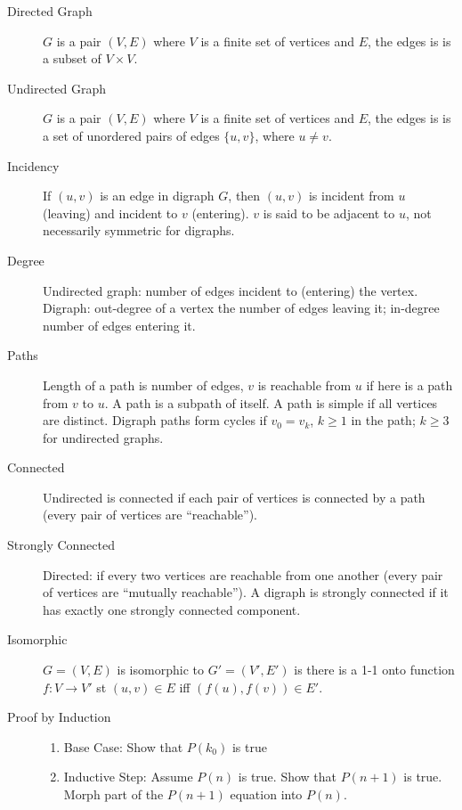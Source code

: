 \documentclass[8pt]{article}
\begin{document}

\begin{multicols}{2}
  \begin{description}
  \item[Directed Graph] $G$ is a pair $(V,E)$ where $V$ is a finite
    set of vertices and $E$, the edges is is a subset of $V \times V$.
  \item[Undirected Graph] $G$ is a pair $(V,E)$ where $V$ is a finite
    set of vertices and $E$, the edges is is a set of unordered
    pairs of edges $\{u,v\}$, where $u \not= v$.
  \item[Incidency] If $(u,v)$ is an edge in digraph $G$, then $(u,v)$
    is incident from $u$ (leaving) and incident to $v$ (entering). $v$
    is said to be adjacent to $u$, not necessarily symmetric for
    digraphs.
  \item[Degree] Undirected graph: number of edges incident to
    (entering) the vertex. Digraph: out-degree of a vertex the number
    of edges leaving it; in-degree number of edges entering it.
  \item[Paths] Length of a path is number of edges, $v$ is reachable
    from $u$ if here is a path from $v$ to $u$. A path is a subpath of
    itself. A path is simple if all vertices are distinct. Digraph
    paths form cycles if $v_0 = v_k$, $k\ge 1$ in the path; $k\ge3$
    for undirected graphs.
  \item[Connected] Undirected is connected if each pair of vertices is
    connected by a path (every pair of vertices are ``reachable'').
  \item[Strongly Connected] Directed: if every two vertices are
    reachable from one another (every pair of vertices are ``mutually
    reachable''). A digraph is strongly connected if it has exactly
    one strongly connected component.
  \item[Isomorphic] $G=(V,E)$ is isomorphic to $G'=(V',E')$ is there
    is a 1-1 onto function $f:V\rightarrow V'$ st $(u,v) \in E$ iff
    $(f(u),f(v)) \in E'$.
  \item[Proof by Induction] \hfill
    \begin{enumerate}
    \item Base Case: Show that $P(k_0)$ is true
    \item Inductive Step: Assume $P(n)$ is true. Show that $P(n+1)$ is
      true. Morph part of the $P(n+1)$ equation into $P(n)$.
    \end{enumerate}

\end{description}
\end{multicols}
\end{document}
